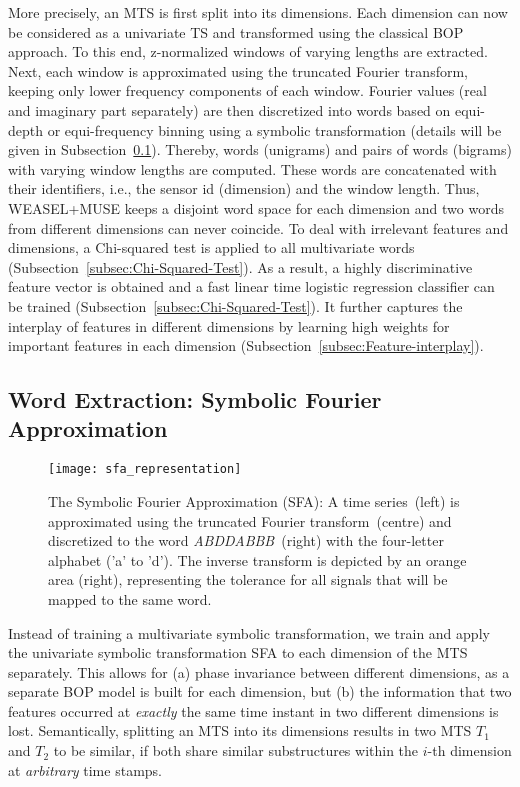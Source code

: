 \documentclass[sigconf]{acmart}
\begin{document}
More precisely, an MTS is first split into its dimensions. Each dimension can now be considered as a univariate TS and transformed using the classical BOP approach. To this end, z-normalized windows of varying lengths are extracted. Next, each window is approximated using the truncated Fourier transform, keeping only lower frequency components of each window. Fourier values (real and imaginary part separately) are then discretized into words based on equi-depth or equi-frequency binning using a symbolic transformation (details will be given in Subsection~\ref{subsec:SymbolicRepresentation}). Thereby, words (unigrams) and pairs of words (bigrams) with varying window lengths are computed. These words are concatenated with their identifiers, i.e., the sensor id (dimension) and the window length.
Thus, WEASEL+MUSE keeps a disjoint word space for each dimension and two words from different dimensions can never coincide. To deal with irrelevant features and dimensions, a Chi-squared test is applied to all multivariate words (Subsection~\ref{subsec:Chi-Squared-Test}). As a result, a highly discriminative feature vector is obtained and a fast linear time logistic regression classifier can be trained (Subsection~\ref{subsec:Chi-Squared-Test}). It further captures the interplay of features in different dimensions by learning high weights for important features in each dimension (Subsection~\ref{subsec:Feature-interplay}).


\subsection{Word Extraction: Symbolic Fourier Approximation}\label{subsec:SymbolicRepresentation}

\begin{figure}
	\begin{centering}
		\texttt{[image: sfa\_representation]}
	\end{centering}
	\caption{The Symbolic Fourier Approximation (SFA): A time series~(left) is approximated using the truncated Fourier transform~(centre) and discretized to the word \emph{ABDDABBB}~(right) with the four-letter alphabet ('a' to 'd'). The inverse transform is depicted by an orange area (right), representing the tolerance for all signals that will be mapped to the same word.\label{fig:SFATransform}}
\end{figure}

Instead of training a multivariate symbolic transformation, we train and apply the univariate symbolic transformation SFA to each dimension of the MTS separately. This allows for (a) phase invariance between different dimensions, as a separate BOP model is built for each dimension, but (b) the information that two features occurred at \emph{exactly} the same time instant in two different dimensions is lost.
Semantically, splitting an MTS into its dimensions results in two MTS $T_1$ and $T_2$ to be similar, if both share similar substructures within the $i$-th dimension at \emph{arbitrary} time stamps. 
\end{document}
